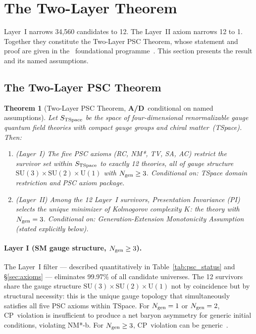 \documentclass[11pt,openany]{book}
\newtheorem{theorem}{Theorem}[chapter]
\theoremstyle{remark}
\newcommand{\NEMS}{\text{NEMS}}
\newcommand{\Ngen}{N_{\rm gen}}
\newcommand{\CatAD}{\textbf{A/D}}
\begin{document}
\FloatBarrier

\section{The Two-Layer Theorem}
\label{sec:twolayer}

Layer~I narrows 34,560 candidates to 12. The Layer~II axiom narrows 12 to 1. Together
they constitute the Two-Layer PSC Theorem, whose statement and proof are given in the
\NEMS\ foundational programme~\cite{SpivackNEMS05}. This section presents the result
and its named assumptions.

\subsection*{The Two-Layer PSC Theorem}

\begin{theorem}[Two-Layer PSC Theorem, \CatAD\ conditional on named assumptions]
\label{thm:two_layer}
Let $S_{\rm TSpace}$ be the space of four-dimensional renormalizable gauge quantum field
theories with compact gauge groups and chiral matter~\textnormal{(TSpace)}. Then:
\begin{enumerate}[label=(\roman*)]
\item \textnormal{(Layer~I)} The five PSC axioms \textnormal{(RC, NM*, TV, SA, AC)} restrict
  the survivor set within $S_{\rm TSpace}$ to exactly 12 theories, all of gauge structure
  $\mathrm{SU}(3)\times\mathrm{SU}(2)\times\mathrm{U}(1)$ with $\Ngen \geq 3$.
  Conditional on: TSpace domain restriction and PSC axiom package.
\item \textnormal{(Layer~II)} Among the 12 Layer~I survivors, Presentation Invariance
  \textnormal{(PI)} selects the unique minimizer of Kolmogorov complexity $K$: the theory
  with $\Ngen = 3$.
  Conditional on: Generation-Extension Monotonicity Assumption
  \textnormal{(stated explicitly below)}.
\end{enumerate}
\end{theorem}

\paragraph{Layer I (SM gauge structure, $\Ngen \geq 3$).}
The Layer~I filter --- described quantitatively in Table~\ref{tab:psc_status} and
\S\ref{sec:axioms} --- eliminates 99.97\% of all candidate universes. The 12 survivors
share the gauge structure $\mathrm{SU}(3)\times\mathrm{SU}(2)\times\mathrm{U}(1)$ not
by coincidence but by structural necessity: this is the unique gauge topology that
simultaneously satisfies all five PSC axioms within TSpace. For $\Ngen = 1$ or
$\Ngen = 2$, CP~violation is insufficient to produce a net baryon asymmetry for generic
initial conditions, violating NM*-b. For $\Ngen \geq 3$, CP~violation can be
generic~\cite{SpivackNEMS05}.
\end{document}
